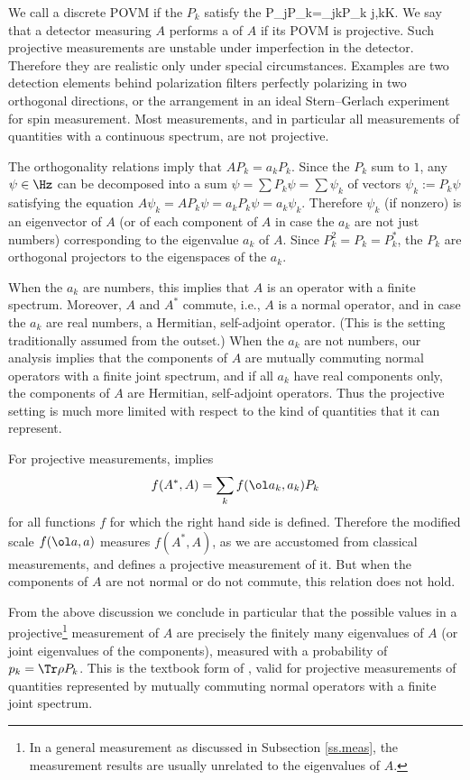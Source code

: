 \documentclass[12pt]{article}
\begin{document}
We call a discrete POVM  if the $P_k$ satisfy the
P_jP_k=\delta_{jk}P_k \for j,k\in K.
\eeq
We say that a detector measuring $A$ performs a
 of $A$ if its POVM is projective.
Such projective measurements are unstable under imperfection in the
detector. Therefore they are realistic only under special circumstances.
Examples are two detection elements behind
polarization filters perfectly polarizing in two orthogonal directions,
or the arrangement in an ideal Stern--Gerlach experiment for spin
measurement. Most measurements, and in particular all measurements of
quantities with a continuous spectrum, are not projective.

The orthogonality relations imply that $AP_k=a_kP_k$. Since the $P_k$
sum to $1$, any $\psi\in\Hz$ can be decomposed into a sum
$\psi=\sum P_k\psi =\sum\psi_k$ of vectors $\psi_k:=P_k\psi$
satisfying the equation $A\psi_k=AP_k\psi=a_kP_k\psi=a_k\psi_k$.
Therefore $\psi_k$ (if nonzero) is an eigenvector of $A$ (or of each
component of $A$ in case the $a_k$ are not just numbers) corresponding
to the eigenvalue $a_k$ of $A$. Since $P_k^2=P_k=P_k^*$, the $P_k$ are
orthogonal projectors to the eigenspaces of the $a_k$.

When the $a_k$ are numbers,
this implies that $A$ is an operator with a finite spectrum. Moreover,
$A$ and $A^*$ commute, i.e., $A$ is a normal operator, and in case the
$a_k$ are real numbers, a Hermitian, self-adjoint operator. (This is the
setting traditionally assumed from the outset.) When the
$a_k$ are not numbers, our analysis implies that the components of $A$
are mutually commuting normal operators with a finite joint spectrum,
and if all $a_k$ have real components only, the components of $A$ are
Hermitian, self-adjoint operators.
Thus the projective setting is much more limited with respect to the
kind of quantities that it can represent.

For projective measurements,  implies
\[
f(A^*,A)=\sum_k f(\ol a_k,a_k) P_k
\]
for all functions $f$ for which the right hand side is defined.
Therefore the modified scale $f(\ol a,a)$ measures $f(A^*,A)$, as we
are accustomed from classical measurements, and defines a projective
measurement of it. But when the components of $A$ are not normal or do
not commute, this relation does not hold.

From the above discussion we conclude in particular that the possible
values in a projective\footnote{
In a general measurement as discussed in Subsection \ref{ss.meas}, the
measurement results are usually unrelated to the eigenvalues of $A$.
} %
measurement of $A$ are precisely the finitely
many eigenvalues of $A$ (or joint eigenvalues of the components),
measured with a probability of $p_k=\Tr \rho P_k$. This is the textbook
form of , valid for projective measurements of
quantities represented by mutually commuting normal operators with a
finite joint spectrum.
\end{document}
